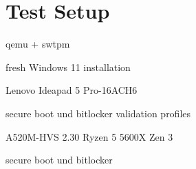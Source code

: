 
\chapter{Test Setup}

qemu + swtpm

fresh Windows 11 installation

Lenovo Ideapad 5 Pro-16ACH6

secure boot und bitlocker
validation profiles


A520M-HVS 2.30
Ryzen 5 5600X Zen 3

secure boot und bitlocker